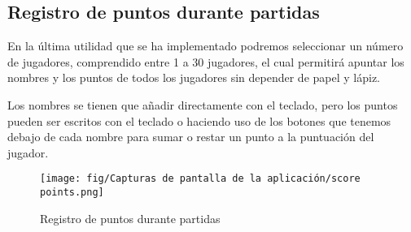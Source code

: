 \subsection{Registro de puntos durante partidas}

En la última utilidad que se ha implementado podremos seleccionar un número de jugadores, comprendido entre 1 a 30 jugadores, el cual permitirá apuntar los nombres y los puntos de todos los jugadores sin depender de papel y lápiz.

Los nombres se tienen que añadir directamente con el teclado, pero los puntos pueden ser escritos con el teclado o haciendo uso de los botones que tenemos debajo de cada nombre para sumar o restar un punto a la puntuación del jugador.

\begin{figure}[H]
    \centering
    \texttt{[image: fig/Capturas de pantalla de la aplicación/score points.png]}
    \caption{Registro de puntos durante partidas}
    \label{fig:registro puntos}
\end{figure}

\newpage